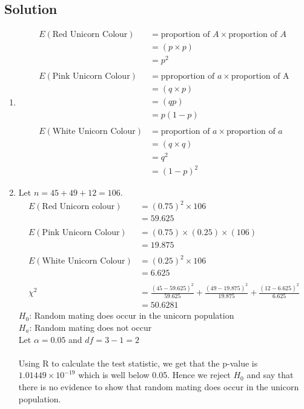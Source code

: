 \documentclass[12pt,a4paper]{article}
\makeatletter
\newenvironment{folding}{\endgroup}{\begingroup \def \@currenvir{folding}\edef \@currenvline{\on@line}}
\makeatother
\begin{document}
\begin{folding}
\begin{centering}
		\subsection*{Solution}
	\end{centering}
	\begin{enumerate} [label = (\alph*)]
		\item 
		\begin{align*}
		E(\text{Red Unicorn Colour}) &= \text{proportion of $A$} \times \text{proportion of $A$} \\
											  &= (p \times p) \\
											  &= p^2\\\\
		E(\text{Pink Unicorn Colour}) &= \text{pproportion of $a$} \times \text{proportion of A} \\
													     &= (q \times p) \\
													     &= (qp) \\
													     &= p(1 - p) \\\\
		E(\text{White Unicorn Colour})	&= \text{proportion of $a$} \times \text{proportion of $a$} \\
															 &= (q \times q) \\
															 &=  q^2 \\
															 &= (1-p)^2
	  \end{align*}
  	\item Let $n = 45 + 49 + 12 = 106$.
  	\begin{align*}
  		E(\text{Red Unicorn colour}) &= (0.75)^2 \times 106 \\
  														&= 59.625 \\\\
  		E(\text{Pink Unicorn Colour}) &= (0.75) \times(0.25) \times (106) \\
  														 &= 19.875 \\\\
  	    E(\text{White Unicorn Colour}) &= (0.25)^2 \times 106 \\
  	    													&= 6.625\\\\
  		\chi^2 &= \frac{(45 - 59.625)^2}{59.625} + \frac{(49 - 19.875)^2}{19.875} + \frac{(12 - 6.625)^2}{6.625} \\
  				   &= 50.6281					 
  	\end{align*}
  	$H_0$: Random mating does occur in the unicorn population \\
  	$H_a$: Random mating does not occur \\
  	Let $\alpha = 0.05$ and $df = 3 - 1 = 2$ \\\\
  	Using R to calculate the test statistic, we get that the p-value is $1.01449 \times 10^{-19}$ which is well below 0.05. Hence we reject $H_0$ and say that there is no evidence to show that random mating does occur in the unicorn population.  
	\end{enumerate}
	

\end{folding}
\end{document}
